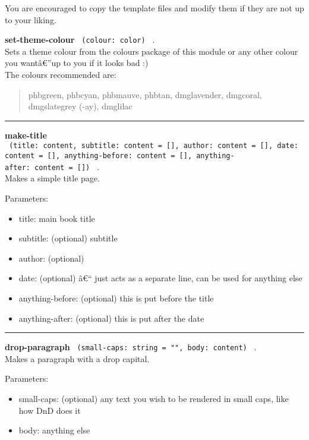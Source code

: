 You are encouraged to copy the template files and modify them if they
are not up to your liking.

\textbf{set-theme-colour} \texttt{\ (colour:\ color)\ } .\\
Sets a theme colour from the colours package of this module or any other
colour you wantâ€''up to you if it looks bad :)\\
The colours recommended are:

\begin{quote}
phbgreen, phbcyan, phbmauve, phbtan, dmglavender, dmgcoral, dmgslategrey
(-ay), dmglilac
\end{quote}

\begin{center}\rule{0.5\linewidth}{0.5pt}\end{center}

\textbf{make-title}
\texttt{\ (title:\ content,\ subtitle:\ content\ =\ {[}{]},\ author:\ content\ =\ {[}{]},\ date:\ content\ =\ {[}{]},\ anything-before:\ content\ =\ {[}{]},\ anything-after:\ content\ =\ {[}{]})\ }
.\\
Makes a simple title page.

Parameters:

\begin{itemize}
\tightlist
\item
  title: main book title
\item
  subtitle: (optional) subtitle
\item
  author: (optional)
\item
  date: (optional) â€`` just acts as a separate line, can be used for
  anything else
\item
  anything-before: (optional) this is put before the title
\item
  anything-after: (optional) this is put after the date
\end{itemize}

\begin{center}\rule{0.5\linewidth}{0.5pt}\end{center}

\textbf{drop-paragraph}
\texttt{\ (small-caps:\ string\ =\ "",\ body:\ content)\ } .\\
Makes a paragraph with a drop capital.

Parameters:

\begin{itemize}
\tightlist
\item
  small-caps: (optional) any text you wish to be rendered in small caps,
  like how DnD does it
\item
  body: anything else
\end{itemize}

